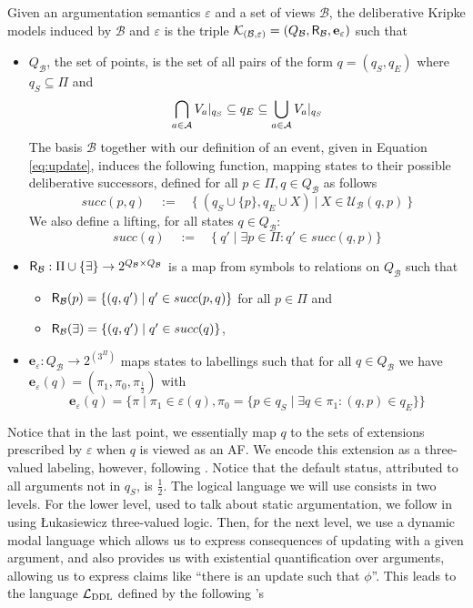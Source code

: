 \documentclass{llncs}
\newcommand{\dlangm}{{\mathcal L}_{\acro{DDL}}}
\newcommand{\pis}[1]{{\mathbf e}_{#1}}
\newcommand{\carriers}[1]{Q_{#1}}
\newcommand{\kmod}[2]{{\cal K}_{(#1,#2)}}
\newcommand{\rels}[1]{{\sf R_{#1}}}
\newcommand{\update}[3]{{\mathcal U}_{#1}(#2,#3)}
\newcommand{\views}{\mathcal B}
\newcommand{\sem}{\varepsilon}
\begin{document}
\begin{definition}\label{def:main} Given an argumentation semantics $\sem$ and a set of views $\views$, the deliberative Kripke models induced by $\views$ and $\sem$ is the triple $\kmod \views \sem = (\carriers \views, \rels \views,\pis \sem)$ such that
\begin{itemize}
\item $\carriers \views$, the set of points, is the set of all pairs of the form $q = (q_S,q_E)$ where $q_S \subseteq \Pi$ and $$\bigcap_{a \in \mathcal A}{V_a}|_{q_S} \subseteq q_E \subseteq \bigcup_{a \in \mathcal A}{V_a}|_{q_S}$$
The basis $\views$ together with our definition of an event, given in Equation \ref{eq:update}, induces the following function, mapping states to their possible deliberative successors, defined for all $p \in \Pi, q \in \carriers \views$ as follows
$$succ(p, q) \quad := \quad \{~(q_S \cup \{p\}, q_E \cup X) ~|~ X \in \update \views q p~\}$$ 
We also define a lifting, for all states $q \in \carriers \views$:
$$succ(q) \quad := \quad \{~q' \mid \exists p \in \Pi: q' \in succ(q,p)\}$$
\item $\rels \views: \Pi \cup \{\exists\} \to 2^{\carriers \views \times \carriers \views}$ is a map from symbols to relations on $\carriers \views$ such that 
\begin{itemize} \item $\rels \views(p) = \{(q,q') \mid q' \in succ(p,q)\}$ for all $p \in \Pi$ and
\item $\rels \views(\exists) = \{(q,q') \mid q' \in succ(q)\}$,
\end{itemize} \vspace{1em}
\item $\pis \sem: \carriers \views \to 2^{(3^\Pi)}$ maps states to labellings such that for all $q \in \carriers \views$ we have $\pis \sem(q) = (\pi_1,\pi_0,\pi_{\frac{1}{2}})$ with $$\pis \sem(q) = \{\pi \mid \pi_1 \in \sem(q), \pi_0 = \{p \in q_S \mid \exists q \in \pi_1: (q,p) \in q_E\}\}$$
\end{itemize}
\end{definition}

Notice that in the last point, we essentially map $q$ to the sets of extensions prescribed by $\sem$ when $q$ is viewed as an AF. We encode this extension as a three-valued labeling, however, following \cite{caminada06}. Notice that the default status, attributed to all arguments not in $q_S$, is $\frac{1}{2}$. The logical language we will use consists in two levels. For the lower level, used to talk about static argumentation, we follow \cite{Arieli,Sjur-SYNT} in using {\L}ukasiewicz three-valued logic. Then, for the next level, we use a dynamic modal language which allows us to express consequences of updating with a given argument, and also provides us with existential quantification over arguments, allowing us to express claims like ``there is an update such that $\phi$''. This leads to the language $\dlangm$ defined by the following 's
\end{document}
